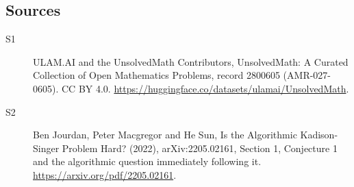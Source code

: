 \documentclass[11pt]{article}
\begin{document}
\subsection{Sources}
\begin{description}
\item[\hypertarget{source:2800605:1}{S1}] ULAM.AI and the UnsolvedMath Contributors, UnsolvedMath: A Curated Collection of Open Mathematics Problems, record 2800605 (AMR-027-0605). CC BY 4.0. \url{https://huggingface.co/datasets/ulamai/UnsolvedMath}.
\item[\hypertarget{source:2800605:2}{S2}] Ben Jourdan, Peter Macgregor and He Sun, Is the Algorithmic Kadison-Singer Problem Hard? (2022), arXiv:2205.02161, Section 1, Conjecture 1 and the algorithmic question immediately following it. \url{https://arxiv.org/pdf/2205.02161}.
\end{description}
\label{end:2800605}
\end{document}
